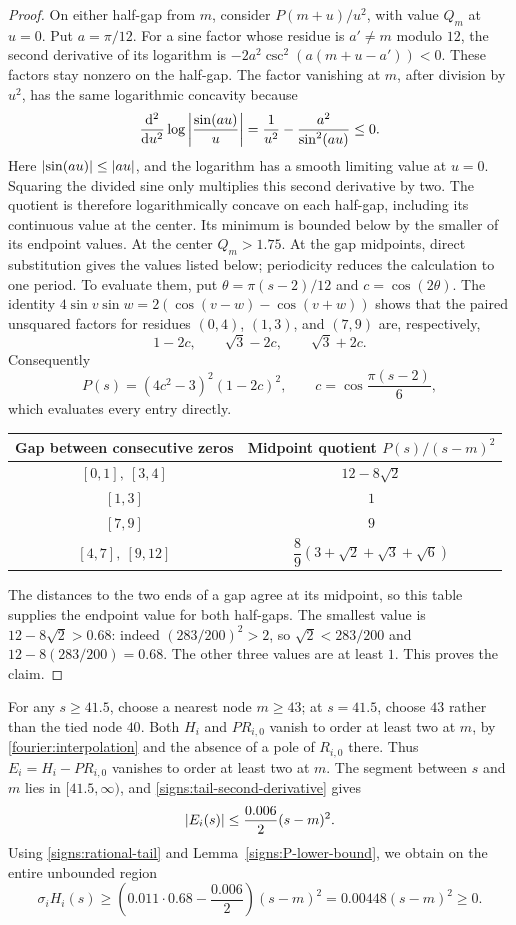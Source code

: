 \begin{proof}
On either half-gap from $m$, consider $P(m+u)/u^2$, with value $Q_m$ at
$u=0$.  Put $a=\pi/12$.  For a sine factor whose residue is $a'\ne m$
modulo $12$, the second derivative of its logarithm is
$-2a^2\csc^2(a(m+u-a'))<0$.  These factors stay nonzero on the half-gap.
The factor vanishing at $m$, after division by $u^2$, has the same
logarithmic concavity because
\[
 \frac{\mathop{}\!\mathrm d^2}{\mathop{}\!\mathrm d u^2}\log\left\lvert\frac{\sin(au)}{u}\right\rvert
 =\frac1{u^2}-\frac{a^2}{\sin^2(au)}\le0.
\]
Here $\left\lvert\sin(au)\right\rvert\le\left\lvert au\right\rvert$, and the logarithm has a smooth limiting
value at $u=0$.  Squaring the divided sine only multiplies this second
derivative by two.
The quotient is therefore logarithmically concave on each half-gap,
including its continuous value at the center.  Its minimum is bounded
below by the smaller of its endpoint values.  At the center
$Q_m>1.75$.  At the gap midpoints, direct substitution gives the values
listed below; periodicity reduces the calculation to one period.
To evaluate them, put $\theta=\pi(s-2)/12$ and $c=\cos(2\theta)$.
The identity $4\sin v\sin w=2(\cos(v-w)-\cos(v+w))$ shows that the paired
unsquared factors for residues $(0,4)$, $(1,3)$, and $(7,9)$ are,
respectively,
\[
 1-2c,\qquad \sqrt3-2c,\qquad \sqrt3+2c.
\]
Consequently
\[
 P(s)=(4c^2-3)^2(1-2c)^2,
 \qquad c=\cos\frac{\pi(s-2)}6,
\]
which evaluates every entry directly.
\begin{center}
\begin{tabular}{c|c}
Gap between consecutive zeros & Midpoint quotient $P(s)/(s-m)^2$\\
\hline
$[0,1],\ [3,4]$ & $12-8\sqrt2$\\
$[1,3]$ & $1$\\
$[7,9]$ & $9$\\
$[4,7],\ [9,12]$ & $\dfrac89(3+\sqrt2+\sqrt3+\sqrt6)$
\end{tabular}
\end{center}
The distances to the two ends of a gap agree at its midpoint, so this
table supplies the endpoint value for both half-gaps.  The smallest value
is $12-8\sqrt2>0.68$: indeed $(283/200)^2>2$, so
$\sqrt2<283/200$ and $12-8(283/200)=0.68$.  The other three values are
at least $1$.  This proves the claim.
\end{proof}

For any $s\ge41.5$, choose a nearest node $m\ge43$; at $s=41.5$, choose
$43$ rather than the tied node $40$.  Both $H_i$ and $P R_{i,0}$ vanish
to order at least two at $m$, by \eqref{fourier:interpolation} and the absence of a
pole of $R_{i,0}$ there.  Thus
$E_i=H_i-P R_{i,0}$ vanishes to order at least two at $m$.  The segment between
$s$ and $m$ lies in $[41.5,\infty)$, and
\eqref{signs:tail-second-derivative} gives
\[
  \left\lvert E_i(s)\right\rvert\le\frac{0.006}{2}(s-m)^2.
\]
Using \eqref{signs:rational-tail} and
Lemma~\ref{signs:P-lower-bound}, we obtain on the entire unbounded region
\begin{equation}\label{signs:tail-margin}
 \sigma_iH_i(s)
 \ge\left(0.011\cdot0.68-\frac{0.006}{2}\right)(s-m)^2
 =0.00448(s-m)^2\ge0.
\end{equation}

